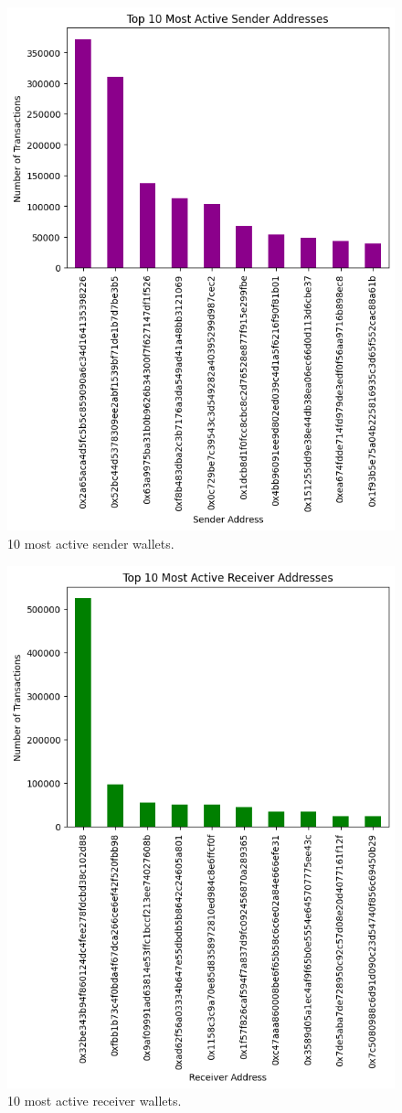 \documentclass[sigconf]{acmart}
\begin{document}
\begin{figure}[H]
    \centering
    \includegraphics[width=0.8\linewidth]{M6-active-sender.png}
    \caption{10 most active sender wallets.}
    \label{fig:activeSenders}
\end{figure}

\begin{figure}[H]
    \centering
    \includegraphics[width=0.8\linewidth]{M6-active-receiver.png}
    \caption{10 most active receiver wallets.}
    \label{fig:activeReceivers}
\end{figure}
\end{document}
